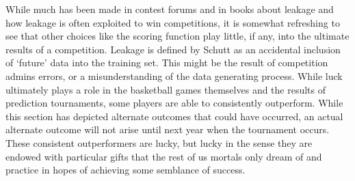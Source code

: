 While much has been made in contest forums and in books \cite{schutt2013doing} about leakage and how leakage is often exploited to win competitions, it is somewhat refreshing to see that other choices like the scoring function play little, if any, into the ultimate results of a competition. Leakage is defined by Schutt as an accidental inclusion of `future' data into the training set. This might be the result of competition admins errors, or a misunderstanding of the data generating process. While luck ultimately plays a role in the basketball games themselves and the results of prediction tournaments, some players are able to consistently outperform. While this section has depicted alternate outcomes that could have occurred, an actual alternate outcome will not arise until next year when the tournament occurs.  These consistent outperformers are lucky, but lucky in the sense they are endowed with particular gifts that the rest of us mortals only dream of and practice in hopes of achieving some semblance of success.  